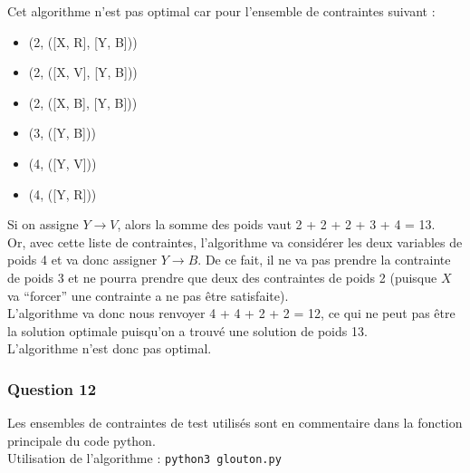 \documentclass{report}
\begin{document}
Cet algorithme n'est pas optimal car pour l'ensemble de contraintes suivant :\\
\begin{itemize}
\item[] (2, ([X, R], [Y, B]))
\item[] (2, ([X, V], [Y, B]))
\item[] (2, ([X, B], [Y, B]))
\item[] (3, ([Y, B]))
\item[] (4, ([Y, V]))
\item[] (4, ([Y, R]))
\end{itemize}
Si on assigne $Y \rightarrow V$, alors la somme des poids vaut 2 + 2 + 2 + 3 + 4 = 13.\\
Or, avec cette liste de contraintes, l'algorithme va considérer les deux variables de poids 4 et va donc assigner $Y \rightarrow B$.
De ce fait, il ne va pas prendre la contrainte de poids 3 et ne pourra prendre que deux des contraintes de poids 2 (puisque $X$ va ``forcer'' une contrainte a ne pas être satisfaite).\\
L'algorithme va donc nous renvoyer 4 + 4 + 2 + 2 = 12, ce qui ne peut pas être la solution optimale puisqu'on a trouvé une solution de poids 13.\\
L'algorithme n'est donc pas optimal.\\

\subsubsection*{Question 12}

Les ensembles de contraintes de test utilisés sont en commentaire dans la fonction principale du code python.\\
Utilisation de l'algorithme : \verb|python3 glouton.py|\\
\end{document}
